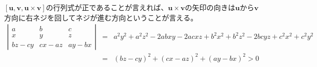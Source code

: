 \documentclass{jarticle}
\begin{document}
\begin{enumerate}
    $\left[ \bm u, \bm v, \bm u \times \bm v \right]$の行列式が正であることが言えれば、$\bm u \times \bm v$の矢印の向きは$\bm u$から$\bm v$方向に右ネジを回してネジが進む方向ということが言える。
    \begin{eqnarray*} 
      \left| 
        \begin{array}{ccc}
          a & b & c \\
          x & y & z \\
          bz-cy & cx-az & ay-bx 
        \end{array}
      \right| 
    & = & a^{2} y^{2} + a^{2} z^{2} - 2 a b x y - 2 a c x z + b^{2} x^{2} + b^{2} z^{2} - 2 b c y z + c^{2} x^{2} + c^{2} y^{2} \\
    & = & (bz-cy)^2+(cx-az)^2+(ay-bx)^2 > 0
    \end{eqnarray*}
\end{enumerate}
\end{document}
